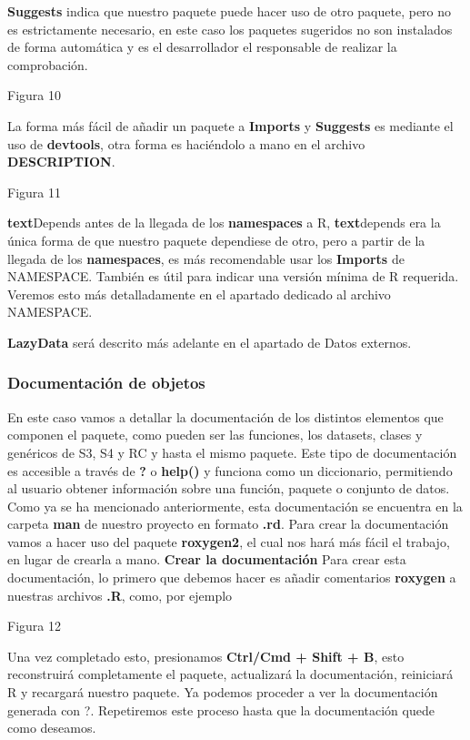 \textbf{Suggests} indica que nuestro paquete puede hacer uso de otro paquete, pero no es
estrictamente necesario, en este caso los paquetes sugeridos no son instalados de forma
autom\'atica y es el desarrollador el responsable de realizar la comprobaci\'on.

Figura 10

La forma m\'as f\'acil de a\~nadir un paquete a \textbf{Imports} y \textbf{Suggests} es mediante el uso de
\textbf{devtools}, otra forma es haci\'endolo a mano en el archivo \textbf{DESCRIPTION}.

Figura 11

\textbf{text}{Depends} antes de la llegada de los \textbf{namespaces} a R, \textbf{text}{depends} era la \'unica forma de que
nuestro paquete dependiese de otro, pero a partir de la llegada de los \textbf{namespaces}, es m\'as
recomendable usar los \textbf{Imports} de NAMESPACE. Tambi\'en es \'util para indicar una versi\'on
m\'inima de R requerida. Veremos esto m\'as detalladamente en el apartado dedicado al archivo
NAMESPACE.

\textbf{LazyData} ser\'a descrito m\'as adelante en el apartado de Datos externos.

\subsubsection{Documentaci\'on de objetos}

En este caso vamos a detallar la documentaci\'on de los distintos elementos que componen el
paquete, como pueden ser las funciones, los datasets, clases y gen\'ericos de S3, S4 y RC y
hasta el mismo paquete.
Este tipo de documentaci\'on es accesible a trav\'es de \textbf{?} o \textbf{help()} y funciona como un
diccionario, permitiendo al usuario obtener informaci\'on sobre una funci\'on, paquete o conjunto
de datos.
Como ya se ha mencionado anteriormente, esta documentaci\'on se encuentra en la carpeta
\textbf{man} de nuestro proyecto en formato \textbf{.rd}. Para crear la documentaci\'on vamos a hacer uso del
paquete \textbf{roxygen2}, el cual nos har\'a m\'as f\'acil el trabajo, en lugar de crearla a mano.
\textbf{Crear la documentaci\'on}
Para crear esta documentaci\'on, lo primero que debemos hacer es a\~nadir comentarios
\textbf{roxygen} a nuestras archivos \textbf{.R}, como, por ejemplo

Figura 12

Una vez completado esto, presionamos \textbf{Ctrl/Cmd + Shift + B}, esto reconstruir\'a
completamente el paquete, actualizar\'a la documentaci\'on, reiniciar\'a R y recargar\'a nuestro
paquete. Ya podemos proceder a ver la documentaci\'on generada con ?. Repetiremos este
proceso hasta que la documentaci\'on quede como deseamos.\\

